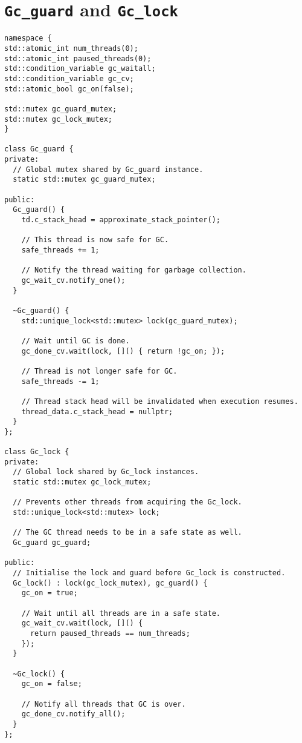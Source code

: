 \section{\texttt{Gc\_guard} and \texttt{Gc\_lock}}
\label{sec:gclock-code}

\begin{code}
\begin{verbatim}
namespace {
std::atomic_int num_threads(0);
std::atomic_int paused_threads(0);
std::condition_variable gc_waitall;
std::condition_variable gc_cv;
std::atomic_bool gc_on(false);

std::mutex gc_guard_mutex;
std::mutex gc_lock_mutex;
}

class Gc_guard {
private:
  // Global mutex shared by Gc_guard instance.
  static std::mutex gc_guard_mutex;

public:
  Gc_guard() {
    td.c_stack_head = approximate_stack_pointer();

    // This thread is now safe for GC.
    safe_threads += 1;

    // Notify the thread waiting for garbage collection.
    gc_wait_cv.notify_one();
  }

  ~Gc_guard() {
    std::unique_lock<std::mutex> lock(gc_guard_mutex);

    // Wait until GC is done.
    gc_done_cv.wait(lock, []() { return !gc_on; });

    // Thread is not longer safe for GC.
    safe_threads -= 1;

    // Thread stack head will be invalidated when execution resumes.
    thread_data.c_stack_head = nullptr;
  }
};

class Gc_lock {
private:
  // Global lock shared by Gc_lock instances.
  static std::mutex gc_lock_mutex;

  // Prevents other threads from acquiring the Gc_lock.
  std::unique_lock<std::mutex> lock;

  // The GC thread needs to be in a safe state as well.
  Gc_guard gc_guard;

public:
  // Initialise the lock and guard before Gc_lock is constructed.
  Gc_lock() : lock(gc_lock_mutex), gc_guard() {
    gc_on = true;

    // Wait until all threads are in a safe state.
    gc_wait_cv.wait(lock, []() {
      return paused_threads == num_threads;
    });
  }

  ~Gc_lock() {
    gc_on = false;

    // Notify all threads that GC is over.
    gc_done_cv.notify_all();
  }
};
\end{verbatim}
\end{code}

